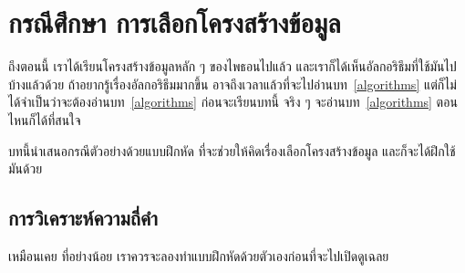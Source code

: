 \chapter{กรณีศึกษา การเลือกโครงสร้างข้อมูล}


ถึงตอนนี้ เราได้เรียนโครงสร้างข้อมูลหลัก ๆ ของไพธอนไปแล้ว
และเราก็ได้เห็นอัลกอริธึมที่ใช้มันไปบ้างแล้วด้วย
ถ้าอยากรู้เรื่องอัลกอริธึมมากขึ้น อาจถึงเวลาแล้วที่จะไปอ่านบท~\ref{algorithms}
แต่ก็ไม่ได้จำเป็นว่าจะต้องอ่านบท~\ref{algorithms} ก่อนจะเรียนบทนี้ 
จริง ๆ จะอ่านบท~\ref{algorithms} ตอนไหนก็ได้ที่สนใจ


บทนี้นำเสนอกรณีตัวอย่างด้วยแบบฝึกหัด 
ที่จะช่วยให้คิดเรื่องเลือกโครงสร้างข้อมูล และก็จะได้ฝึกใช้มันด้วย

\section{การวิเคราะห์ความถี่คำ}
\label{analysis}


เหมือนเคย ที่อย่างน้อย เราควรจะลองทำแบบฝึกหัดด้วยตัวเองก่อนที่จะไปเปิดดูเฉลย

